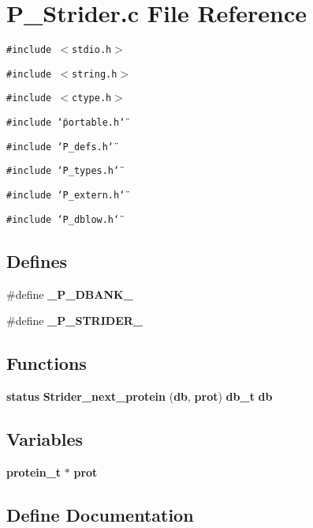 \section{P\_\-Strider.c File Reference}
\label{P__Strider_8c}
{\tt \#include $<$stdio.h$>$}\par
{\tt \#include $<$string.h$>$}\par
{\tt \#include $<$ctype.h$>$}\par
{\tt \#include \char`\"{}portable.h\char`\"{}}\par
{\tt \#include \char`\"{}P\_\-defs.h\char`\"{}}\par
{\tt \#include \char`\"{}P\_\-types.h\char`\"{}}\par
{\tt \#include \char`\"{}P\_\-extern.h\char`\"{}}\par
{\tt \#include \char`\"{}P\_\-dblow.h\char`\"{}}\par
\subsection*{Defines}
\begin{CompactItemize}
\item 
\#define {\bf \_\-P\_\-DBANK\_\-}
\item 
\#define {\bf \_\-P\_\-STRIDER\_\-}
\end{CompactItemize}
\subsection*{Functions}
\begin{CompactItemize}
\item 
{\bf status} {\bf Strider\_\-next\_\-protein} ({\bf db}, {\bf prot}) {\bf db\_\-t} {\bf db}
\end{CompactItemize}
\subsection*{Variables}
\begin{CompactItemize}
\item 
{\bf protein\_\-t} $\ast$ {\bf prot}
\end{CompactItemize}


\subsection{Define Documentation}
